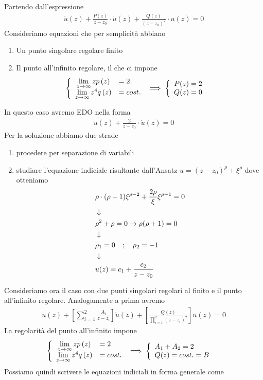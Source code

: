 Partendo dall'espressione
\begin{align}
	\ddot{u}(z) + \frac{P(z)}{z-z_0}\cdot \dot{u}(z) + \frac{Q(z)}{(z-z_0)^2} \cdot u(z)=0 
\end{align}
Consideriamo equazioni che per semplicità abbiano
\begin{enumerate}
	\item Un punto singolare regolare finito
	\item Il punto all'infinito regolare, il che ci impone
	\begin{align}
		\double{\limit{z}{\infty}zp\left(z\right) &= 2 \hfill}{\limit{z}{\infty} z^4 q\left(z\right) &= cost.} &\implies \double{P(z) = 2}{Q(z)= 0}   
	\end{align}
\end{enumerate}
In questo caso avremo EDO nella forma
\begin{align}
	\ddot{u}(z) + \frac{2}{z-z_0}\cdot \dot{u}(z) =0 
\end{align}
Per la soluzione abbiamo due strade
\begin{enumerate}
	\item procedere per separazione di variabili
	\item studiare l'equazione indiciale risultante dall'Ansatz $u= (z-z_0)^\rho + \xi^\rho$ dove otteniamo
	\begin{align}
		&\rho\cdot(\rho-1)\xi^{\rho -2} + \frac{2\rho}{\xi}\xi^{\rho-1} =0\\ &\downarrow \nonumber \\
		&\rho^2 + \rho =0 \to \rho(\rho +1) =0 \nonumber \\ &\downarrow \nonumber \\
		&\rho_1 = 0 \quad ; \quad \rho_2 = -1\\ &\downarrow \nonumber \\
		&u(z) = c_1 + \frac{c_2}{z-z_0} 
	\end{align}
\end{enumerate}
\newpage
{}
Consideriamo ora il caso con due punti singolari regolari al finito e il punto all'infinito regolare. Analogamente a prima avremo
\begin{align}
	\ddot{u}(z) + \left[ \sum_{i=1}^{2} \frac{A_i}{z-z_i} \right] \dot{u}(z) + \left[ \frac{Q(z)}{\prod_{i=1}^2 (z-z_i)^2} \right] u(z) =0
\end{align}
La regolarità del punto all'infinito impone
	\begin{align}
	\double{\limit{z}{\infty}zp\left(z\right) &= 2 \hfill}{\limit{z}{\infty} z^4 q\left(z\right) &= cost.} &\implies \double{A_1 + A_2 = 2\hfill}{Q(z)= cost.  = B}   \label{2punti}
\end{align}
Possiamo quindi scrivere le equazioni indiciali in forma generale come
